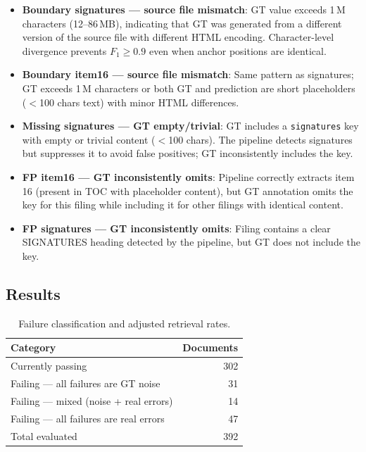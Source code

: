 \documentclass[11pt,a4paper]{article}
\begin{document}
\begin{itemize}[nosep]
    \item \textbf{Boundary signatures --- source file mismatch}: GT value exceeds 1\,M characters (12--86\,MB), indicating that GT was generated from a different version of the source file with different HTML encoding. Character-level divergence prevents $F_1 \geq 0.9$ even when anchor positions are identical.
    \item \textbf{Boundary item16 --- source file mismatch}: Same pattern as signatures; GT exceeds 1\,M characters or both GT and prediction are short placeholders ($<$100 chars text) with minor HTML differences.
    \item \textbf{Missing signatures --- GT empty/trivial}: GT includes a \texttt{signatures} key with empty or trivial content ($<$100 chars). The pipeline detects signatures but suppresses it to avoid false positives; GT inconsistently includes the key.
    \item \textbf{FP item16 --- GT inconsistently omits}: Pipeline correctly extracts item 16 (present in TOC with placeholder content), but GT annotation omits the key for this filing while including it for other filings with identical content.
    \item \textbf{FP signatures --- GT inconsistently omits}: Filing contains a clear SIGNATURES heading detected by the pipeline, but GT does not include the key.
\end{itemize}

\subsection{Results}

\begin{table}[H]
\centering
\caption{Failure classification and adjusted retrieval rates.}
\label{tab:noise}
\begin{tabular}{lr}
\toprule
\textbf{Category} & \textbf{Documents}\\
\midrule
Currently passing & 302\\
Failing --- all failures are GT noise & 31\\
Failing --- mixed (noise + real errors) & 14\\
Failing --- all failures are real errors & 47\\
\midrule
Total evaluated & 392\\
\bottomrule
\end{tabular}
\end{table}
\end{document}
